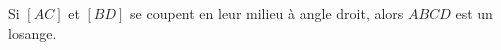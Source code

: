 Si $[AC]$ et $[BD]$ se coupent en leur milieu à angle droit, alors $ABCD$ est un losange.

\begin{reponses}
\end{reponses}


